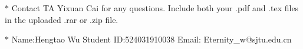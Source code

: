 \documentclass[12pt,a4paper]{article}
\theoremstyle{definition}
\begin{document}
\noindent

\noindent{}
\begin{center}
  \footnotesize{\color{red}$*$ Contact TA Yixuan Cai for any
    questions. Include both your .pdf and .tex files in the uploaded
  .rar or .zip file.}

  \footnotesize{\color{blue}$*$ Name:Hengtao Wu  \quad
  Student ID:524031910038 \quad Email: Eternity\_w@sjtu.edu.cn}

\end{center}
\end{document}
